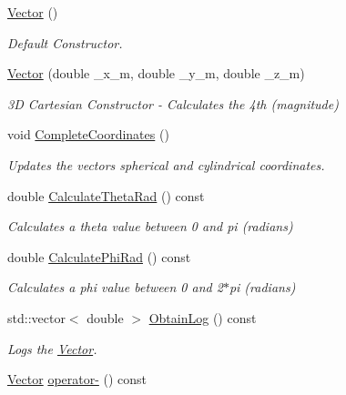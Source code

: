 \begin{DoxyCompactItemize}
\item 
\hyperlink{classosse_1_1collaborate_1_1_vector_af495b2efd099a897642ec06be87abc16}{Vector} ()
\begin{DoxyCompactList}\small\item\em Default Constructor. \end{DoxyCompactList}\item 
\hyperlink{classosse_1_1collaborate_1_1_vector_a5eefcbb3a555a019d530b8b82ac568af}{Vector} (double \+\_\+x\+\_\+m, double \+\_\+y\+\_\+m, double \+\_\+z\+\_\+m)
\begin{DoxyCompactList}\small\item\em 3D Cartesian Constructor -\/ Calculates the 4th (magnitude) \end{DoxyCompactList}\item 
void \hyperlink{classosse_1_1collaborate_1_1_vector_a427667ec4887828003c2d3652462ad94}{Complete\+Coordinates} ()
\begin{DoxyCompactList}\small\item\em Updates the vector\textquotesingle{}s spherical and cylindrical coordinates. \end{DoxyCompactList}\item 
double \hyperlink{classosse_1_1collaborate_1_1_vector_a21c93523c1b0c578e88b4ba831b2021e}{Calculate\+Theta\+Rad} () const
\begin{DoxyCompactList}\small\item\em Calculates a theta value between 0 and pi (radians) \end{DoxyCompactList}\item 
double \hyperlink{classosse_1_1collaborate_1_1_vector_af4e5954804008f6fd041536ab5bb8efe}{Calculate\+Phi\+Rad} () const
\begin{DoxyCompactList}\small\item\em Calculates a phi value between 0 and 2$\ast$pi (radians) \end{DoxyCompactList}\item 
std\+::vector$<$ double $>$ \hyperlink{classosse_1_1collaborate_1_1_vector_acc6656dc258e0eab8cdd3baa0ac7a255}{Obtain\+Log} () const
\begin{DoxyCompactList}\small\item\em Logs the \hyperlink{classosse_1_1collaborate_1_1_vector}{Vector}. \end{DoxyCompactList}\item 
\hyperlink{classosse_1_1collaborate_1_1_vector}{Vector} \hyperlink{classosse_1_1collaborate_1_1_vector_a7d9cb2cd1fdeaae594569c3f8886a17c}{operator-\/} () const

\end{DoxyCompactItemize}
